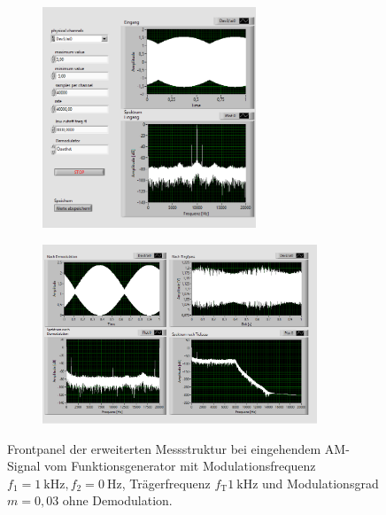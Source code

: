 		\begin{figure}[H]
			\centering
			\begin{subfigure}[c]{\textwidth}
				\centering
				\includegraphics[width=0.7\textwidth]{pic/dam_quadrat1.png}
			\end{subfigure}
			\begin{subfigure}[c]{\textwidth}
				\centering
				\includegraphics[width=0.9\textwidth]{pic/dam_quadrat2.png}
			\end{subfigure}	
			\caption{Frontpanel der erweiterten Messstruktur bei eingehendem AM-Signal vom Funktionsgenerator mit Modulationsfrequenz $f_1= \SI{1}{\kilo\hertz}, f_2 = \SI{0}{\hertz}$, Trägerfrequenz $f_\text{T}\SI{1}{\kilo\hertz}$ und Modulationsgrad $m = 0,03$ ohne Demodulation.}
			\label{fig:dam_quadrat}	
		\end{figure} 
	

